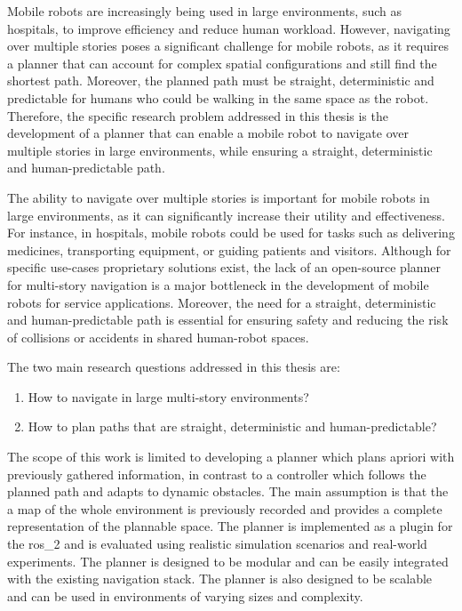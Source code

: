 Mobile robots are increasingly being used in large environments, such as hospitals, to improve efficiency and reduce human workload. However, navigating over multiple stories poses a significant challenge for mobile robots, as it requires a planner that can account for complex spatial configurations and still find the shortest path. Moreover, the planned path must be straight, deterministic and predictable for humans who could be walking in the same space as the robot. Therefore, the specific research problem addressed in this thesis is the development of a planner that can enable a mobile robot to navigate over multiple stories in large environments, while ensuring a straight, deterministic and human-predictable path. 

The ability to navigate over multiple stories is important for mobile robots in large environments, as it can significantly increase their utility and effectiveness. For instance, in hospitals, mobile robots could be used for tasks such as delivering medicines, transporting equipment, or guiding patients and visitors. Although for specific use-cases proprietary solutions exist, the lack of an open-source planner for multi-story navigation is a major bottleneck in the development of mobile robots for service applications. Moreover, the need for a straight, deterministic and human-predictable path is essential for ensuring safety and reducing the risk of collisions or accidents in shared human-robot spaces.

The two main research questions addressed in this thesis are:
\begin{enumerate}
    \item How to navigate in large multi-story environments?
    \item How to plan paths that are straight, deterministic and human-predictable?
\end{enumerate}

The scope of this work is limited to developing a planner which plans apriori with previously gathered information, in contrast to a controller which follows the planned path and adapts to dynamic obstacles. The main assumption is that the a map of the whole environment is previously recorded and provides a complete representation of the plannable space. The planner is implemented as a plugin for the \gls{ros_2} and is evaluated using realistic simulation scenarios and real-world experiments. The planner is designed to be modular and can be easily integrated with the existing navigation stack. The planner is also designed to be scalable and can be used in environments of varying sizes and complexity.

